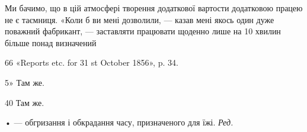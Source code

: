 Ми бачимо, що в цій атмосфері творення додаткової вартости
додатковою працею не є таємниця. «Коли б ви мені дозволили, —
казав мені якось один дуже поважний фабрикант, — заставляти
працювати щоденно лише на 10 хвилин більше понад визначений

66 «Reports etc. for 31 st October 1856», p. 34.

5» Там же.

40 Там же.

• — обгризання і обкрадання часу, призначеного для їжі. \emph{Ред.}
\parbreak{}  %
